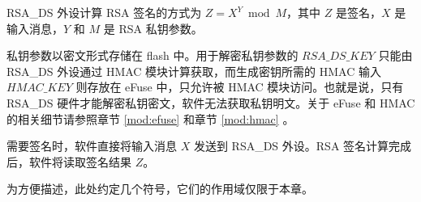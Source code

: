 \documentclass[main\_\_CN.tex]{subfiles}
\begin{document}
RSA\_DS 外设计算 RSA 签名的方式为 \begin{math}Z = X^{Y} \bmod M\end{math}，其中 \begin{math}Z\end{math} 是签名，\begin{math}X\end{math} 是输入消息，\begin{math}Y\end{math} 和 \begin{math}M\end{math} 是 RSA 私钥参数。

私钥参数以密文形式存储在 flash 中。用于解密私钥参数的 \begin{math} RSA\_DS\_KEY \end{math} 只能由 RSA\_DS 外设通过 HMAC 模块计算获取，而生成密钥所需的 HMAC 输入 \begin{math} HMAC\_KEY \end{math} 则存放在 eFuse 中，只允许被 HMAC 模块访问。也就是说，只有 RSA\_DS 硬件才能解密私钥密文，软件无法获取私钥明文。关于 eFuse 和 HMAC 的相关细节请参照章节 \ref{mod:efuse} \textit{} 和章节 \ref{mod:hmac} \textit{}。

需要签名时，软件直接将输入消息 \begin{math}X\end{math} 发送到 RSA\_DS 外设。RSA 签名计算完成后，软件将读取签名结果 \begin{math}Z\end{math}。


为方便描述，此处约定几个符号，它们的作用域仅限于本章。
\end{document}
